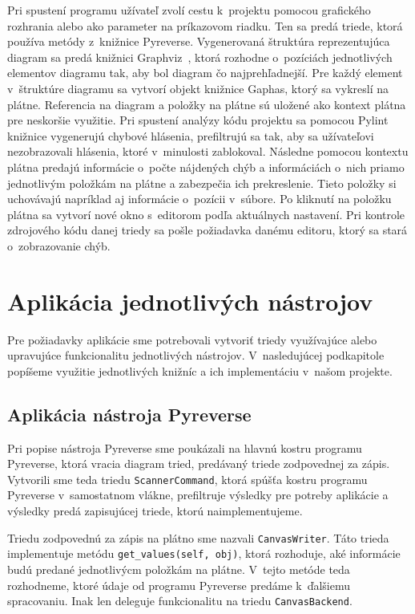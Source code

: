 \documentclass[11pt,oneside,final]{fithesis2}
\begin{document}
Pri spustení programu užívateľ zvolí cestu k~projektu pomocou grafického rozhrania alebo ako parameter na príkazovom riadku. Ten sa predá triede, ktorá používa metódy z~knižnice Pyreverse. Vygenerovaná štruktúra reprezentujúca diagram sa predá knižnici Graphviz~\cite{graphviz}, ktorá rozhodne o~pozíciách jednotlivých elementov diagramu tak, aby bol diagram čo najprehľadnejší. Pre každý element v~štruktúre diagramu sa vytvorí objekt knižnice Gaphas, ktorý sa vykreslí na plátne. Referencia na diagram a položky na plátne sú uložené ako kontext plátna pre neskoršie využitie. Pri spustení analýzy kódu projektu sa pomocou Pylint knižnice vygenerujú chybové hlásenia, prefiltrujú sa tak, aby sa užívateľovi nezobrazovali hlásenia, ktoré v~minulosti zablokoval. Následne pomocou kontextu plátna predajú informácie o~počte nájdených chýb a informáciách o~nich priamo jednotlivým položkám na plátne a zabezpečia ich prekreslenie. Tieto položky si uchovávajú napríklad aj informácie o~pozícii v~súbore. Po kliknutí na položku plátna sa vytvorí nové okno s~editorom podľa aktuálnych nastavení. Pri kontrole zdrojového kódu danej triedy sa pošle požiadavka danému editoru, ktorý sa stará o~zobrazovanie chýb.

	
	\section{Aplikácia jednotlivých nástrojov}
	Pre požiadavky aplikácie sme potrebovali vytvoriť triedy využívajúce alebo upravujúce funkcionalitu jednotlivých nástrojov. V~nasledujúcej podkapitole popíšeme využitie jednotlivých knižníc a ich implementáciu v~našom projekte.
	
		\subsection{Aplikácia nástroja Pyreverse}	
			Pri popise nástroja Pyreverse sme poukázali na hlavnú kostru programu Pyreverse, ktorá vracia diagram tried, predávaný triede zodpovednej za zápis. Vytvorili sme teda triedu \texttt{ScannerCommand}, ktorá spúšťa kostru programu Pyreverse v~samostatnom vlákne, prefiltruje výsledky pre potreby aplikácie a výsledky predá zapisujúcej triede, ktorú naimplementujeme.
			
			Triedu zodpovednú za zápis na plátno sme nazvali \texttt{CanvasWriter}. Táto trieda  implementuje metódu \texttt{get\_values(self, obj)}, ktorá rozhoduje, aké informácie budú predané jednotlivýcm položkám na plátne. V~tejto metóde teda rozhodneme, ktoré údaje od programu Pyreverse predáme k~ďalšiemu spracovaniu. Inak len deleguje funkcionalitu na triedu \texttt{CanvasBackend}.
		
\end{document}
